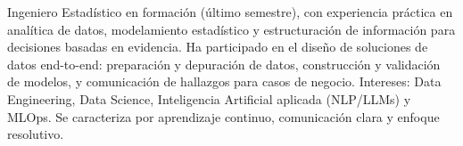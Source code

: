 
\begin{cvparagraph}

Ingeniero Estadístico en formación (último semestre), con experiencia práctica en analítica de datos, modelamiento estadístico y estructuración de información para decisiones basadas en evidencia. Ha participado en el diseño de soluciones de datos end-to-end: preparación y depuración de datos, construcción y validación de modelos, y comunicación de hallazgos para casos de negocio. Intereses: Data Engineering, Data Science, Inteligencia Artificial aplicada (NLP/LLMs) y MLOps. Se caracteriza por aprendizaje continuo, comunicación clara y enfoque resolutivo.

\end{cvparagraph}
